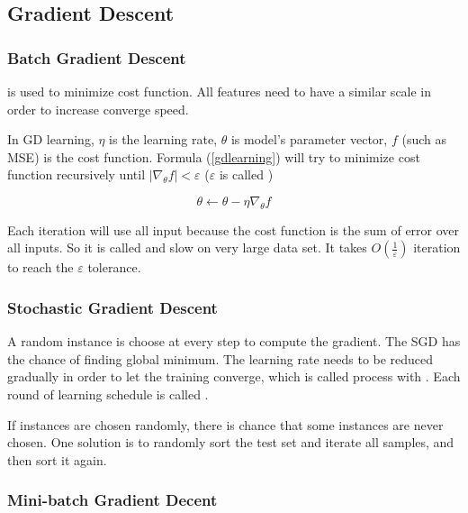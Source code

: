 \subsection{Gradient Descent}

\subsubsection{Batch Gradient Descent}

 is used to minimize cost function. All features need to have a similar scale in order to increase converge speed.

In GD learning, $\eta$ is the learning rate, $\theta$ is model's parameter vector, $f$ (such as MSE) is the cost function. Formula (\ref{gdlearning}) will try to minimize cost function recursively until $|\nabla_\theta f| < \varepsilon$ ($\varepsilon$ is called )

\begin{equation}\label{gdlearning}
	\theta \gets \theta - \eta \nabla_\theta f
\end{equation}

Each iteration will use all input because the cost function is the sum of error over all inputs. So it is called  and slow on very large data set. It takes $\displaystyle O\left(\frac{1}{\varepsilon}\right)$ iteration to reach the $\varepsilon$ tolerance.



\subsubsection{Stochastic Gradient Descent}

A random instance is choose at every step to compute the gradient. The SGD has the chance of finding global minimum. The learning rate needs to be reduced gradually in order to let the training converge, which is called  process with . Each round of learning schedule is called .

If instances are chosen randomly, there is chance that some instances are never chosen. One solution is to randomly sort the test set and iterate all samples, and then sort it again.



\subsubsection{Mini-batch Gradient Decent}

